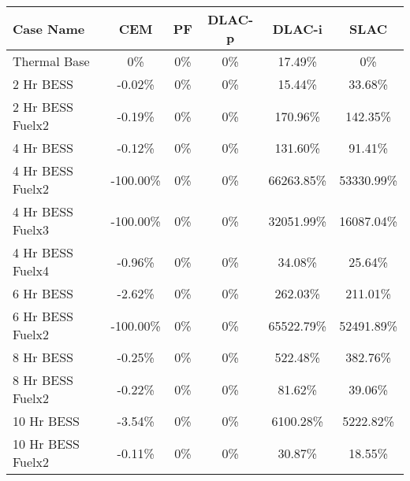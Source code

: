 \begin{tabular}{lccccc}
\toprule
Case Name & CEM & PF & DLAC-p & DLAC-i & SLAC \\
\midrule
Thermal Base & 0\% & 0\% & 0\% & 17.49\% & 0\% \\
2 Hr BESS & -0.02\% & 0\% & 0\% & 15.44\% & 33.68\% \\
2 Hr BESS Fuelx2 & -0.19\% & 0\% & 0\% & 170.96\% & 142.35\% \\
4 Hr BESS & -0.12\% & 0\% & 0\% & 131.60\% & 91.41\% \\
4 Hr BESS Fuelx2 & -100.00\% & 0\% & 0\% & 66263.85\% & 53330.99\% \\
4 Hr BESS Fuelx3 & -100.00\% & 0\% & 0\% & 32051.99\% & 16087.04\% \\
4 Hr BESS Fuelx4 & -0.96\% & 0\% & 0\% & 34.08\% & 25.64\% \\
6 Hr BESS & -2.62\% & 0\% & 0\% & 262.03\% & 211.01\% \\
6 Hr BESS Fuelx2 & -100.00\% & 0\% & 0\% & 65522.79\% & 52491.89\% \\
8 Hr BESS & -0.25\% & 0\% & 0\% & 522.48\% & 382.76\% \\
8 Hr BESS Fuelx2 & -0.22\% & 0\% & 0\% & 81.62\% & 39.06\% \\
10 Hr BESS & -3.54\% & 0\% & 0\% & 6100.28\% & 5222.82\% \\
10 Hr BESS Fuelx2 & -0.11\% & 0\% & 0\% & 30.87\% & 18.55\% \\
\bottomrule
\end{tabular}
